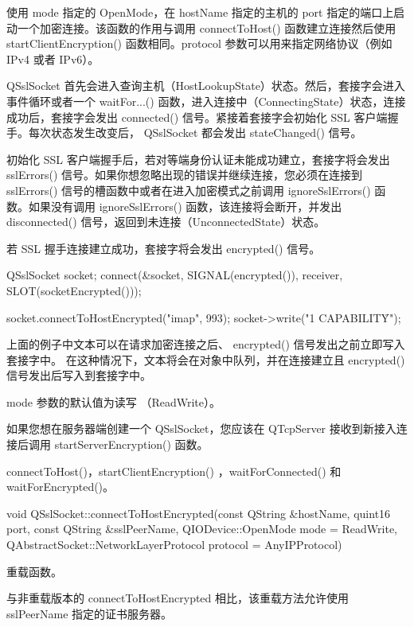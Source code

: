 使用 mode 指定的 OpenMode，在 hostName 指定的主机的 port 指定的端口上启动一个加密连接。该函数的作用与调用 connectToHost() 函数建立连接然后使用 startClientEncryption() 函数相同。protocol 参数可以用来指定网络协议（例如 IPv4 或者 IPv6）。

QSslSocket 首先会进入查询主机（HostLookupState）状态。然后，套接字会进入事件循环或者一个 waitFor...() 函数，进入连接中（ConnectingState）状态，连接成功后，套接字会发出 connected() 信号。紧接着套接字会初始化 SSL 客户端握手。每次状态发生改变后， QSslSocket 都会发出 stateChanged() 信号。

初始化 SSL 客户端握手后，若对等端身份认证未能成功建立，套接字将会发出 sslErrors() 信号。如果你想忽略出现的错误并继续连接，您必须在连接到 sslErrors() 信号的槽函数中或者在进入加密模式之前调用 ignoreSslErrors() 函数。如果没有调用 ignoreSslErrors() 函数，该连接将会断开，并发出 disconnected() 信号，返回到未连接（UnconnectedState）状态。

若 SSL 握手连接建立成功，套接字将会发出 encrypted() 信号。

\begin{cppcode}
QSslSocket socket;
connect(&socket, SIGNAL(encrypted()), receiver, SLOT(socketEncrypted()));

socket.connectToHostEncrypted("imap", 993);
socket->write("1 CAPABILITY\r\n");
\end{cppcode}

\begin{notice}
上面的例子中文本可以在请求加密连接之后、 encrypted() 信号发出之前立即写入套接字中。
在这种情况下，文本将会在对象中队列，并在连接建立且 encrypted() 信号发出后写入到套接字中。
\end{notice}

mode 参数的默认值为读写 （ReadWrite）。

如果您想在服务器端创建一个 QSslSocket，您应该在 QTcpServer 接收到新接入连接后调用 startServerEncryption() 函数。

\begin{seeAlso}
connectToHost()，startClientEncryption() ，waitForConnected() 和 waitForEncrypted()。
\end{seeAlso}


void QSslSocket::connectToHostEncrypted(const QString \&hostName, quint16 port, const QString \&sslPeerName, QIODevice::OpenMode mode = ReadWrite, QAbstractSocket::NetworkLayerProtocol protocol = AnyIPProtocol)

重载函数。

与非重载版本的 connectToHostEncrypted 相比，该重载方法允许使用 sslPeerName 指定的证书服务器。

